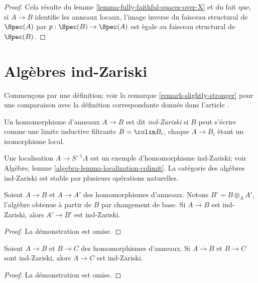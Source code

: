 \begin{proof}
Cela r\'esulte du lemme \ref{lemma-fully-faithful-spaces-over-X}
et du fait que, si $A \to B$ identifie les anneaux locaux, l'image inverse
du faisceau structural de $\Spec(A)$ par $p : \Spec(B) \to \Spec(A)$
est \`egale au faisceau structural de $\Spec(B)$.
\end{proof}




\section{Alg\`ebres ind-Zariski}
\label{section-ind-zariski}

\noindent
Commen\c{c}ons par une d\'efinition; voir la remarque \ref{remark-slightly-stronger}
pour une comparaison avec la d\'efinition correspondante donn\'ee dans l'article \cite{BS}.

\begin{definition}
\label{definition-ind-zariski}
Un homomorphisme d'anneaux $A \to B$ est dit {\it ind-Zariski} si $B$ peut s'\'ecrire
comme une limite inductive filtrante $B = \colim B_i$, chaque $A \to B_i$ \`etant un
isomorphisme local.
\end{definition}

\noindent
Une localisation $A \to S^{-1}A$ est un exemple d'homomorphisme ind-Zariski; voir
Alg\`ebre, lemme \ref{algebra-lemma-localization-colimit}.
La cat\'egorie des alg\`ebres ind-Zariski est stable par plusieurs op\'erations
naturelles.

\begin{lemma}
\label{lemma-base-change-ind-zariski}
Soient $A \to B$ et $A \to A'$ des homomorphismes d'anneaux. Notons $B' = B \otimes_A A'$,
l'alg\`ebre obtenue \`a partir de $B$ par changement de base.
Si $A \to B$ est ind-Zariski, alors $A' \to B'$ est ind-Zariski.
\end{lemma}

\begin{proof}
La d\'emonstration est omise.
\end{proof}

\begin{lemma}
\label{lemma-composition-ind-zariski}
Soient $A \to B$ et $B \to C$ des homomorphismes d'anneaux. Si $A \to B$ et $B \to C$
sont ind-Zariski, alors $A \to C$ est ind-Zariski.
\end{lemma}

\begin{proof}
La d\'emonstration est omise.
\end{proof}

